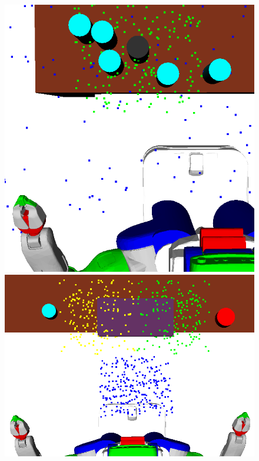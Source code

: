 \begin{figure}[t]
  \centering
    \noindent
    \includegraphics[scale=0.112]{images/learns.png}
    \includegraphics[scale=0.13]{images/dinner_tray_initial.png}

\end{figure}
